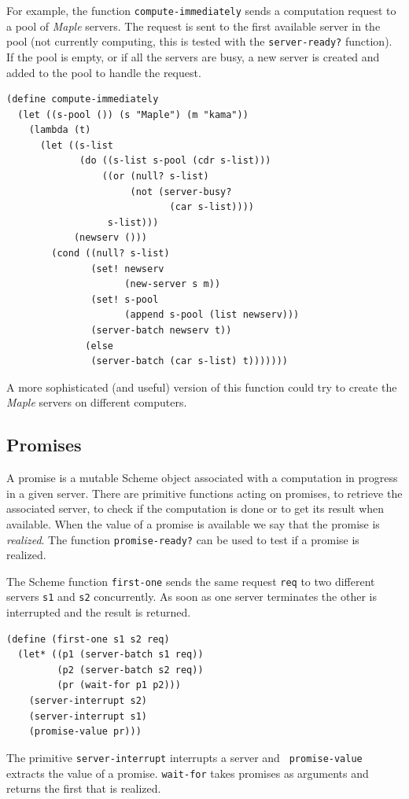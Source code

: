 \documentclass {article}
\begin{document}
For example, the function {\tt compute-immediately} sends a computation
request to a pool of {\sl Maple} servers. The request is sent to the first
available server in the pool (not currently computing, this is tested with the 
{\tt server-ready?} function). 
If the pool is empty, or if all the servers are busy, a new server is created
and added to the pool to handle the request.
\begin{verbatim} 
(define compute-immediately
  (let ((s-pool ()) (s "Maple") (m "kama"))
    (lambda (t)
      (let ((s-list
             (do ((s-list s-pool (cdr s-list)))
                 ((or (null? s-list)
                      (not (server-busy?
                             (car s-list))))
                  s-list)))
            (newserv ()))
        (cond ((null? s-list)
               (set! newserv 
                     (new-server s m))
               (set! s-pool 
                     (append s-pool (list newserv)))
               (server-batch newserv t))
              (else
               (server-batch (car s-list) t)))))))
\end{verbatim} 
A more sophisticated (and useful) version of this function could try to
create the {\sl Maple} servers on different computers.

\subsection{ Promises }

A promise is a mutable Scheme object associated with a computation in
progress in a given server. There are primitive functions acting on
promises, to retrieve the associated server, to check if the computation is
done or to get its result when available. When the value of a promise is
available we say that the promise is {\sl realized}. 
The function {\tt promise-ready?} can be used to test if a promise is
realized. 

The Scheme function {\tt first-one} sends the same request {\tt req} to two
different servers {\tt s1} and {\tt s2} concurrently. 
As soon as one server terminates the other is interrupted and the result is
returned.
\begin{verbatim} 
(define (first-one s1 s2 req)
  (let* ((p1 (server-batch s1 req))
         (p2 (server-batch s2 req))
         (pr (wait-for p1 p2)))
    (server-interrupt s2) 
    (server-interrupt s1)
    (promise-value pr)))
\end{verbatim} 
The primitive {\tt server-interrupt} interrupts a server and {\tt
promise-value} extracts the value of a promise.
{\tt wait-for} takes promises as arguments and returns the first that is 
realized. 
\end{document}
